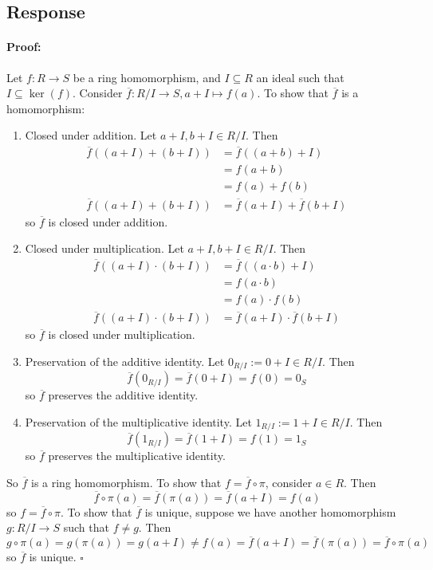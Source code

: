 \documentclass [12pt] {article}
\newenvironment{proof}{\paragraph{Proof:}}{\hfill$\square$}
\begin{document}
\subsection*{Response}
\begin{proof}
    Let $f : R \to S$ be a ring homomorphism, and $I \subseteq R$ an ideal such that 
    $I \subseteq \ker(f)$. Consider $\overline{f} : R/I \to S, a + I \mapsto f(a)$. To show that
    $\overline{f}$ is a homomorphism:
    \begin{enumerate}
        \item Closed under addition. Let $a + I, b + I \in R/I$. Then
            \begin{align*}
                \overline{f}((a + I) + (b + I)) 
                &= \overline{f}((a + b) + I)  \\
                &= f(a + b) \\
                &= f(a) + f(b) \\ 
                \overline{f}((a + I) + (b + I)) 
                &= \overline{f}(a + I) + \overline{f}(b + I)
            \end{align*}
            so $\overline{f}$ is closed under addition.
        \item Closed under multiplication. Let $a + I, b + I \in R/I$. Then
            \begin{align*}
                \overline{f}((a + I) \cdot (b + I)) 
                &= \overline{f}((a \cdot b) + I)  \\
                &= f(a \cdot b) \\
                &= f(a) \cdot f(b) \\ 
                \overline{f}((a + I) \cdot (b + I)) 
                &= \overline{f}(a + I) \cdot \overline{f}(b + I)
            \end{align*}
            so $\overline{f}$ is closed under multiplication.
        \item Preservation of the additive identity. Let $0_{R/I} := 0 + I \in R/I$. Then
            \[\overline{f}(0_{R/I}) = \overline{f}(0 + I) = f(0) = 0_S\]
            so $\overline{f}$ preserves the additive identity.
        \item Preservation of the multiplicative identity. Let $1_{R/I} := 1 + I \in R/I$. Then
            \[\overline{f}(1_{R/I}) = \overline{f}(1 + I) = f(1) = 1_S\]
            so $\overline{f}$ preserves the multiplicative identity.
    \end{enumerate}
    So $\overline{f}$ is a ring homomorphism. To show that $f = \overline{f} \circ \pi$, consider
    $a \in R$. Then
    \[\overline{f} \circ \pi (a) = \overline{f}(\pi(a)) = \overline{f}(a + I) = f(a)\]
    so $f = \overline{f} \circ \pi$. To show that $\overline{f}$ is unique, suppose we have another
    homomorphism $g : R/I \to S$ such that $f \neq g$. Then
    \[
        g \circ \pi (a) = g(\pi(a)) = g(a + I) 
        \neq f(a) 
        = \overline{f}(a + I) = \overline{f}(\pi(a)) = \overline{f} \circ \pi (a)
    \]
    so $\overline{f}$ is unique.
\end{proof}
\newpage
\end{document}
